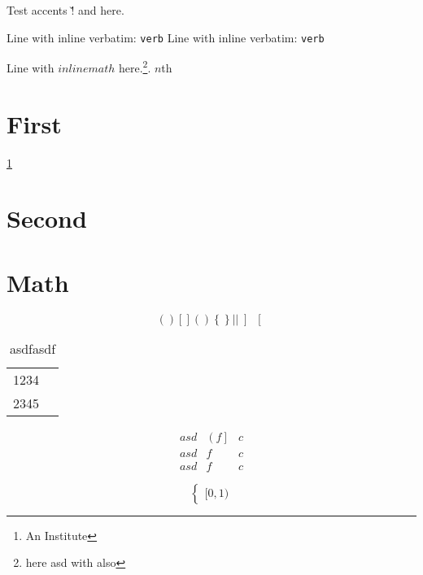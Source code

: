 \documentclass{article}
\begin{document}
Test accents \v! and \v@ here.

Line with inline verbatim: \verb+verb+
Line with inline verbatim: \verb*+verb+

Line with $inline math$ here.\footnote{here {asd} with \cmd also}. $n$th

\section{First}
\label{sec:first}

\ref{sec:first}
\pageref{sec:second}
\nocite{bibkey0}
\cite{bibkey1}
\citet*{bibkey2}
\citep{bibkey3}
\citep[e.g.][]{bibkey4}

\section{Second}
\label{sec:second}

\author{A. Author\thanks{An Institute}}

\section{Math}
\label{sec:math}

\begin{equation}
  ( )
  [ ]

  \left( \right)
  \left\{ \right\}
  \left\lvert \right\rvert
  \left] \right[
\end{equation}

\begin{table}
  \centering
  \caption{asdfasdf}
  \label{tab:}
  \begin{tabular}{cr}
    1234 \\
    2345 \\
  \end{tabular}
\end{table}

\begin{equation}
  \begin{array}{ccc}
    asd & \left( f \right] & c \\
    asd & f & c \\
    asd & f & c
  \end{array}
\end{equation}

\begin{equation}
  \begin{cases}
    [0,1)
  \end{cases}
\end{equation}
\end{document}
